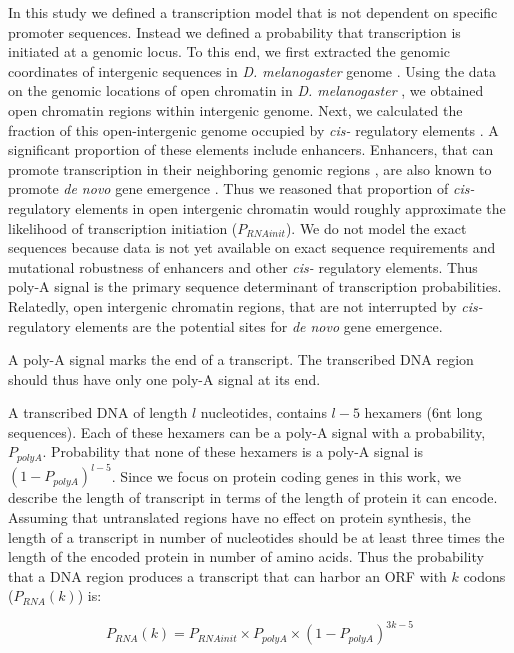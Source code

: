 \documentclass[12pt,a4paper]{article}
\newcommand{\cmnt}[1]{{\color{purple} #1}}
\begin{document}
\cmnt{In this study we defined a transcription model that is not dependent on specific promoter sequences. Instead we defined a probability that transcription is initiated at a genomic locus. To this end, we first extracted the genomic coordinates of intergenic sequences in \textit{D. melanogaster} genome \citep[release 6.49, FlyBase;][]{flybase}. Using the data on the genomic locations of open chromatin in \textit{D. melanogaster} \citep{dmel_Chromatin}, we obtained open chromatin regions within intergenic genome. Next, we calculated the fraction of this open-intergenic genome occupied by \textit{cis-} regulatory elements \citep{RedFly2005,RedFly2007,RedFly2010,RedFly2018,RedFly2022}. A significant proportion of these elements include enhancers. Enhancers, that can promote transcription in their neighboring genomic regions \citep{enhancers}, are also known to promote \textit{de novo} gene emergence \citep{PacoEnhancers}. Thus we reasoned that proportion of \textit{cis-} regulatory elements in open intergenic chromatin would roughly approximate the likelihood of transcription initiation ($P_\textit{RNAinit}$). We do not model the exact sequences because data is not yet available on exact sequence requirements and mutational robustness of enhancers and other \textit{cis-} regulatory elements. Thus poly-A signal is the primary sequence determinant of transcription probabilities. Relatedly, open intergenic chromatin regions, that are not interrupted by \textit{cis-} regulatory elements are the potential sites for \textit{de novo} gene emergence.

A poly-A signal marks the end of a transcript. The transcribed DNA region should thus have only one poly-A signal at its end.} A transcribed DNA of length $l$ nucleotides, contains $l-5$ hexamers (6nt long sequences). Each of these hexamers can be a poly-A signal with a probability, $P_\textit{polyA}$. Probability that none of these hexamers is a poly-A signal is $(1-P_\textit{polyA})^{l-5}$. Since we focus on protein coding genes in this work, we describe the length of transcript in terms of the length of protein it can encode. Assuming that untranslated regions have no effect on protein synthesis, the length of a transcript in number of nucleotides should be at least three times the length of the encoded protein in number of amino acids. Thus the probability that a DNA region produces a transcript that can harbor an ORF with $k$ codons ($P_\textit{RNA}(k)$) is:

\begin{equation}
P_\textit{RNA}(k) = P_\textit{RNAinit} \times P_\textit{polyA} \times (1-P_\textit{polyA})^{3k-5}
\label{eqrnaprob}
\end{equation}
\end{document}
